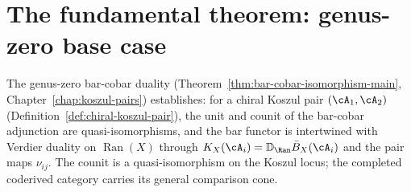 \section{The fundamental theorem: genus-zero base case}
\label{sec:fundamental-theorem-koszul}

\begin{remark}
\label{rem:theorem-a-summary}
The genus-zero bar-cobar duality
(Theorem~\ref{thm:bar-cobar-isomorphism-main},
Chapter~\ref{chap:koszul-pairs}) establishes:
for a chiral Koszul pair $(\cA_1, \cA_2)$
(Definition~\ref{def:chiral-koszul-pair}),
the unit and counit of the bar-cobar adjunction are
quasi-isomorphisms, and the bar functor is intertwined
with Verdier duality on $\operatorname{Ran}(X)$ through
$K_X(\cA_i)=\mathbb D_{\Ran}\bar B_X(\cA_i)$ and the pair maps
$\nu_{ij}$.  The counit is a quasi-isomorphism on the Koszul locus;
the completed coderived category carries its general comparison cone.
\end{remark}

